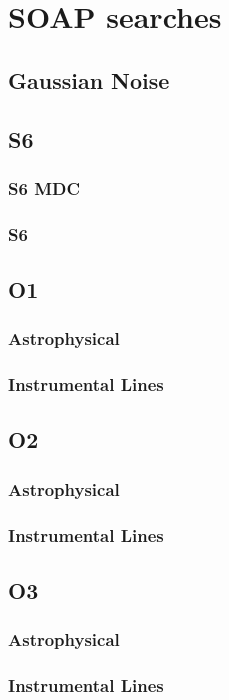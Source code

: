 \chapter{SOAP searches}

\section{Gaussian Noise}

\section{S6}

\subsection{S6 MDC}

\subsection{S6}

\section{O1}

\subsection{Astrophysical}

\subsection{Instrumental Lines}

\section{O2}

\subsection{Astrophysical}

\subsection{Instrumental Lines}

\section{O3}

\subsection{Astrophysical}

\subsection{Instrumental Lines}
